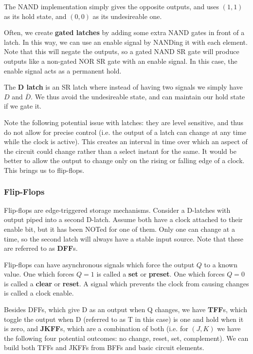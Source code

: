 \documentclass[12pt]{article}
\begin{document}
The NAND implementation simply gives the opposite outputs, and uses $(1,1)$ as its hold state, and $(0,0)$ as its undesireable one.

Often, we create {\bf gated latches} by adding some extra NAND gates in front of a latch. In this way, we can use an enable signal by NANDing it with each element. Note that this will negate the outputs, so a gated NAND SR gate will produce outputs like a non-gated NOR SR gate with an enable signal. In this case, the enable signal acts as a permanent hold.

The {\bf D latch} is an SR latch where instead of having two signals we simply have $D$ and $\overline{D}$. We thus avoid the undesireable state, and can maintain our hold state if we gate it.

Note the following potential issue with latches: they are level sensitive, and thus do not allow for precise control (i.e. the output of a latch can change at any time while the clock is active). This creates an interval in time over which an aspect of the circuit could change rather than a select instant for the same. It would be better to allow the output to change only on the rising or falling edge of a clock. This brings us to flip-flops.

\subsubsection*{Flip-Flops}
Flip-flops are edge-triggered storage mechanisms. Consider a D-latches with output piped into a second D-latch. Assume both have a clock attached to their enable bit, but it has been NOTed for one of them. Only one can change at a time, so the second latch will always have a stable input source. Note that these are referred to as {\bf DFF}s.

Flip-flops can have asynchronous signals which force the output $Q$ to a known value. One which forces $Q = 1$ is called a {\bf set} or {\bf preset}. One which forces $Q = 0$ is called a {\bf clear} or {\bf reset}. A signal which prevents the clock from causing changes is called a clock enable.

Besides DFFs, which give D as an output when Q changes, we have {\bf TFF}s, which toggle the output when D (referred to as T in this case) is one and hold when it is zero, and {\bf JKFF}s, which are a combination of both (i.e. for $(J,K)$ we have the following four potential outcomes: no change, reset, set, complement). We can build both TFFs and JKFFs from BFFs and basic circuit elements.
\end{document}
